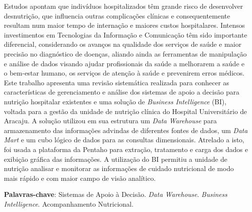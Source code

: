 \setlength{\absparsep}{18pt} %
\begin{resumo}

Estudos apontam que indivíduos hospitalizados têm grande risco de desenvolver desnutrição, que influencia outras complicações clínicas e consequentemente resultam num maior tempo de internação e maiores custos hospitalares. 
Intensos investimentos em Tecnologias da Informação e Comunicação têm sido importante diferencial, considerando os avanços na qualidade dos serviços de saúde e maior precisão no diagnóstico de doenças, aliando ainda as ferramentas de manipulação e análise de dados visando ajudar profissionais da saúde a melhorarem a saúde e o bem-estar humano, os serviços de atenção à saúde e prevenirem erros médicos. 
Este trabalho apresenta uma revisão sistemática realizada para conhecer as características de gerenciamento e análise dos sistemas de apoio a decisão para nutrição hospitalar existentes e uma solução de \textit{Business Intelligence} (BI), voltada para a gestão da unidade de nutrição clínica do Hospital Universitário de Aracaju. A solução utilizou em sua estrutura um \textit{Data Warehouse} para armazenamento das informações advindas de diferentes fontes de dados, um \textit{Data Mart} e um cubo lógico de dados para as consultas dimensionais. 
Atrelado a isto, foi usada a plataforma da Pentaho para extração, tratamento e carga dos dados e exibição gráfica das informações. A utilização do BI permitiu a unidade de nutrição analisar e monitorar as informações de cuidado nutricional de modo mais rápido e com maior campo de visão analítico. 


 \textbf{Palavras-chave}: Sistemas de Apoio à Decisão. \textit{Data Warehouse}. \textit{Business Intelligence}. Acompanhamento Nutricional.
\end{resumo}